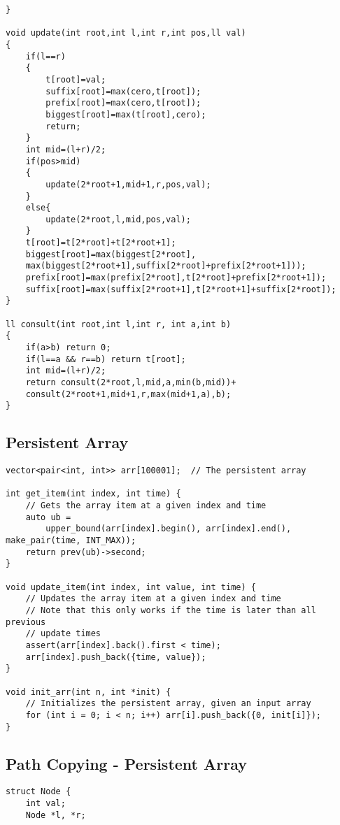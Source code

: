\documentclass[10pt]{article}
\begin{document}
\begin{multicols*}{2}
\begin{lstlisting}[style=compactcpp]
}

void update(int root,int l,int r,int pos,ll val)
{
    if(l==r)
    {
        t[root]=val;
        suffix[root]=max(cero,t[root]);
        prefix[root]=max(cero,t[root]);
        biggest[root]=max(t[root],cero);
        return;
    }
    int mid=(l+r)/2;
    if(pos>mid)
    {
        update(2*root+1,mid+1,r,pos,val);
    }
    else{
        update(2*root,l,mid,pos,val);
    }
    t[root]=t[2*root]+t[2*root+1];
    biggest[root]=max(biggest[2*root],
    max(biggest[2*root+1],suffix[2*root]+prefix[2*root+1]));
    prefix[root]=max(prefix[2*root],t[2*root]+prefix[2*root+1]);
    suffix[root]=max(suffix[2*root+1],t[2*root+1]+suffix[2*root]);
}

ll consult(int root,int l,int r, int a,int b)
{
    if(a>b) return 0;
    if(l==a && r==b) return t[root];
    int mid=(l+r)/2;
    return consult(2*root,l,mid,a,min(b,mid))+
    consult(2*root+1,mid+1,r,max(mid+1,a),b);
}
\end{lstlisting}

\subsection{Persistent Array}

\begin{lstlisting}[style=compactcpp]
vector<pair<int, int>> arr[100001];  // The persistent array

int get_item(int index, int time) {
	// Gets the array item at a given index and time
	auto ub =
	    upper_bound(arr[index].begin(), arr[index].end(), make_pair(time, INT_MAX));
	return prev(ub)->second;
}

void update_item(int index, int value, int time) {
	// Updates the array item at a given index and time
	// Note that this only works if the time is later than all previous
	// update times
	assert(arr[index].back().first < time);
	arr[index].push_back({time, value});
}

void init_arr(int n, int *init) {
	// Initializes the persistent array, given an input array
	for (int i = 0; i < n; i++) arr[i].push_back({0, init[i]});
}
\end{lstlisting}


\subsection{Path Copying - Persistent Array}


\begin{lstlisting}[style=compactcpp]
    	struct Node {
	int val;
	Node *l, *r;


\end{lstlisting}
\end{multicols*}
\end{document}
